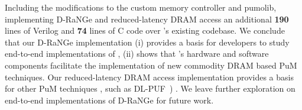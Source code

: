 
Including the modifications to the custom memory controller and pumolib, implementing D-RaNGe and reduced-latency DRAM access  an additional \textbf{190} lines of Verilog and \textbf{74} lines of C code over \X's existing codebase. We conclude that our D-RaNGe implementation (i) provides a basis for \X developers to study end-to-end implementations of , (ii) shows that \X's hardware and software components facilitate the implementation of new {commodity DRAM based} PuM techniques. Our reduced-latency DRAM access implementation provides a basis for other PuM techniques , such as DL-PUF~\cite{kim.hpca18}) . We leave further exploration on end-to-end implementations of D-RaNGe for future work.


\iffalse
\begin{algorithm}[tbh]\footnotesize
        \SetAlgoNlRelativeSize{1.0}
        \DontPrintSemicolon
        \caption{TRNG Microbenchmark}
        \label{alg:trng_microbenchmark}
        for ($period = 100ns$ ; $period$ <= $10000ns$ ; $period$ += $100ns$)\par 
        ~~~~configure\_trng($period$) \par
        ~~~~for ($i = 0$ ; $i$ < 512K ; $i$++)\par
        ~~~~~~~~while ($random\_buffer\_size == 0$); \par
        ~~~~~~~~$read\_random\_number()$; \par
    \end{algorithm}
\fi

